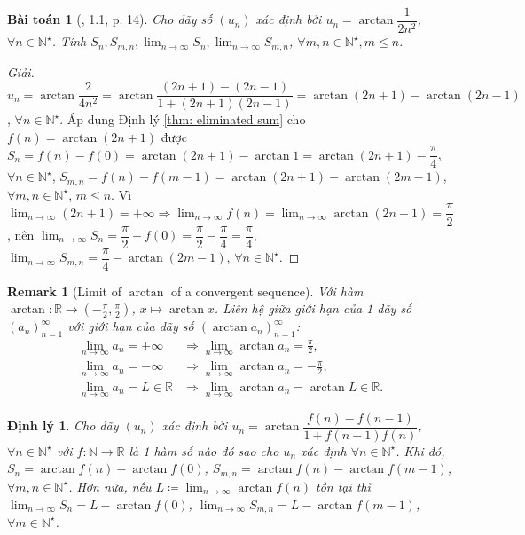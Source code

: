 \documentclass{article}
\newtheorem{baitoan}{Bài toán}
\newtheorem{dinhly}{Định lý}
\newtheorem{remark}{Remark}
\begin{document}
\begin{baitoan}[\cite{Quoc_Long_Dat_Nam_VMC}, 1.1, p. 14]
	Cho dãy số $(u_n)$ xác định bởi $u_n = \arctan\dfrac{1}{2n^2}$, $\forall n\in\mathbb{N}^\star$. Tính $S_n,S_{m,n},\lim_{n\to\infty} S_n,\lim_{n\to\infty} S_{m,n}$, $\forall m,n\in\mathbb{N}^\star,m\le n$.
\end{baitoan}

\begin{proof}[Giải]
	$u_n = \arctan\dfrac{2}{4n^2} = \arctan\dfrac{(2n + 1) - (2n - 1)}{1 + (2n + 1)(2n - 1)} = \arctan(2n + 1) - \arctan(2n - 1)$, $\forall n\in\mathbb{N}^\star$. Áp dụng Định lý \ref{thm: eliminated sum} cho $f(n) = \arctan(2n + 1)$ được $S_n = f(n) - f(0) = \arctan(2n + 1) - \arctan1 = \arctan(2n + 1) - \dfrac{\pi}{4}$, $\forall n\in\mathbb{N}^\star$, $S_{m,n} = f(n) - f(m - 1) = \arctan(2n + 1) - \arctan(2m - 1)$, $\forall m,n\in\mathbb{N}^\star$, $m\le n$. Vì $\lim_{n\to\infty} (2n + 1) = +\infty\Rightarrow\lim_{n\to\infty} f(n) = \lim_{n\to\infty} \arctan(2n + 1) = \dfrac{\pi}{2}$, nên $\lim_{n\to\infty} S_n = \dfrac{\pi}{2} - f(0) = \dfrac{\pi}{2} - \dfrac{\pi}{4} = \dfrac{\pi}{4}$, $\lim_{n\to\infty} S_{m,n} = \dfrac{\pi}{4} - \arctan(2m - 1)$, $\forall n\in\mathbb{N}^\star$.
\end{proof}

\begin{remark}[Limit of $\arctan$ of a convergent sequence]
	Với hàm $\arctan:\mathbb{R}\to\left(-\frac{\pi}{2},\frac{\pi}{2}\right)$, $x\mapsto\arctan x$. Liên hệ giữa giới hạn của 1 dãy số $(a_n)_{n=1}^\infty$ với giới hạn của dãy số $(\arctan a_n)_{n=1}^\infty$:
	\begin{align*}
		\lim_{n\to\infty} a_n = +\infty&\Rightarrow\lim_{n\to\infty} \arctan a_n = \frac{\pi}{2},\\
		\lim_{n\to\infty} a_n = -\infty&\Rightarrow\lim_{n\to\infty} \arctan a_n = -\frac{\pi}{2},\\
		\lim_{n\to\infty} a_n = L\in\mathbb{R}&\Rightarrow\lim_{n\to\infty} \arctan a_n = \arctan L\in\mathbb{R}.
	\end{align*}
\end{remark}

\begin{dinhly}
	Cho dãy $(u_n)$ xác định bởi $u_n = \arctan\dfrac{f(n) - f(n - 1)}{1 + f(n - 1)f(n)}$, $\forall n\in\mathbb{N}^\star$ với $f:\mathbb{N}\to\mathbb{R}$ là 1 hàm số nào đó sao cho $u_n$ xác định $\forall n\in\mathbb{N}^\star$. Khi đó, $S_n = \arctan f(n) - \arctan f(0)$, $S_{m,n} = \arctan f(n) - \arctan f(m - 1)$, $\forall m,n\in\mathbb{N}^\star$. Hơn nữa, nếu $L\coloneqq\lim_{n\to\infty} \arctan f(n)$ tồn tại thì $\lim_{n\to\infty} S_n = L - \arctan f(0)$, $\lim_{n\to\infty} S_{m,n} = L - \arctan f(m - 1)$, $\forall m\in\mathbb{N}^\star$.
\end{dinhly}
\end{document}
